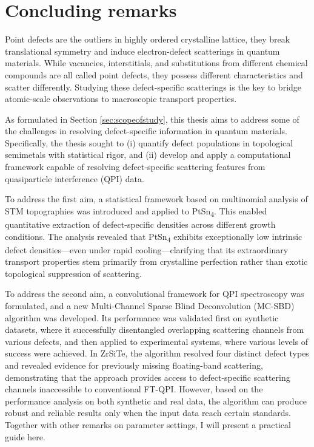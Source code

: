 \chapter{Concluding remarks}
Point defects are the outliers in highly ordered crystalline lattice, they break translational symmetry and induce electron-defect scatterings in quantum materials. While vacancies, interstitials, and substitutions from different chemical compounds are all called point defects, they possess different characteristics and scatter differently. Studying these defect-specific scatterings is the key to bridge atomic-scale observations to macroscopic transport properties. 

As formulated in Section \ref{sec:scopeofstudy}, this thesis aims to address some of the challenges in resolving defect-specific information in quantum materials. Specifically, the thesis sought to (i) quantify defect populations in topological semimetals with statistical rigor, and (ii) develop and apply a computational framework capable of resolving defect-specific scattering features from quasiparticle interference (QPI) data.

To address the first aim, a statistical framework based on multinomial analysis of STM topographies was introduced and applied to PtSn\textsubscript{4}. This enabled quantitative extraction of defect-specific densities across different growth conditions. The analysis revealed that PtSn\textsubscript{4} exhibits exceptionally low intrinsic defect densities—even under rapid cooling—clarifying that its extraordinary transport properties stem primarily from crystalline perfection rather than exotic topological suppression of scattering.

To address the second aim, a convolutional framework for \ac{QPI} spectroscopy was formulated, and a new Multi-Channel Sparse Blind Deconvolution (MC-SBD) algorithm was developed. Its performance was validated first on synthetic datasets, where it successfully disentangled overlapping scattering channels from various defects, and then applied to experimental systems, where various levels of success were achieved. In ZrSiTe, the algorithm resolved four distinct defect types and revealed evidence for previously missing floating-band scattering, demonstrating that the approach provides access to defect-specific scattering channels inaccessible to conventional FT-QPI. However, based on the performance analysis on both synthetic and real data, the algorithm can produce robust and reliable results only when the input data reach certain standards. Together with other remarks on parameter settings, I will present a practical guide here. 

